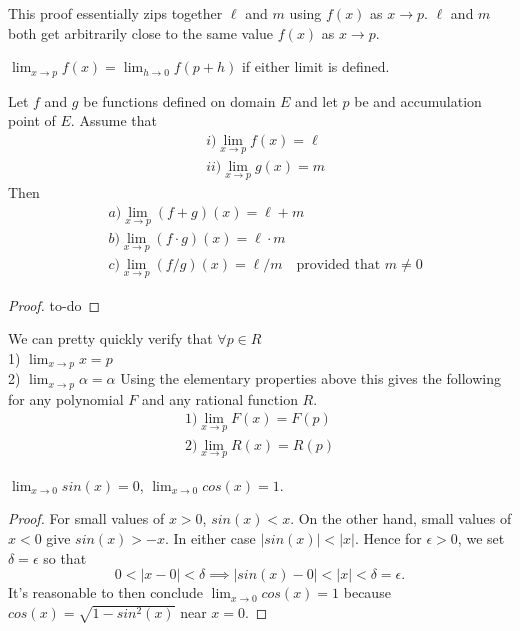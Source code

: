 \documentclass{article}
\begin{document}
This proof essentially zips together \( \ell \) and \( m \) using \( f(x) \) as \( x \to p \).
\( \ell \) and \( m \) both get arbitrarily close to the same value \( f(x) \) as \( x \to p \).

\begin{corollary}
    \( \lim_{x \to p} f(x) = \lim_{h \to 0} f(p + h) \) if either limit is defined.
\end{corollary}

\begin{theorem}
    Let \( f \) and \( g\) be functions defined on domain \( E \) and let \( p \) be
    and accumulation point of \( E \). Assume that
    \begin{align*}
        &i) \lim_{x \to p} f(x) = \ell \\
        &ii) \lim_{x \to p} g(x) = m
    \end{align*}
    Then
    \begin{align*}
        &a) \lim_{x \to p} (f + g)(x) = \ell + m \\
        &b) \lim_{x \to p} (f \cdot g)(x) = \ell \cdot m \\
        &c) \lim_{x \to p} (f / g)(x) = \ell / m \ \ \ \text{ provided that } m \ne 0
    \end{align*}
\end{theorem}
\begin{proof}
    to-do
\end{proof}

We can pretty quickly verify that \( \forall p \in R \) \\
1) \( \lim_{x \to p} x = p\) \\
2) \( \lim_{x \to p} \alpha = \alpha \) 
\medbreak
Using the elementary properties above this gives the following
for any polynomial \( F \) and any rational function \( R \).
\begin{align}
    1) \lim_{x \to p} F(x) = F(p) \\
    2) \lim_{x \to p} R(x) = R(p) 
\end{align}


\begin{exmp}
    \( \lim_{x \to 0} sin(x) = 0 \),  \( \lim_{x \to 0} cos(x) = 1 \).
    \begin{proof}
        For small values of \( x > 0 \), \( sin(x) < x \). On the other hand, 
        small values of \( x < 0 \) give \( sin(x) > -x  \). In either case \( |sin(x)| < |x| \).
        Hence for \( \epsilon > 0 \), we set \( \delta = \epsilon \) so that
        \[
        0 < |x - 0| < \delta \implies |sin(x) - 0| < |x| < \delta = \epsilon.
        \] 
        It's reasonable to then conclude 
        \( \lim_{x \to 0} cos(x) = 1 \)
        because \( cos(x) = \sqrt{1 - sin^2(x)} \) near \( x = 0 \).
        
    \end{proof}
\end{exmp}
\end{document}
